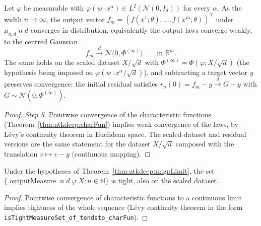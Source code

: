 \begin{theorem}\label{thm:ntkdeep:nngpLimit}
  \leanok
Let $\varphi$ be measurable with $\varphi(w\cdot x^\alpha)\in L^2(\mathcal N(0,I_d))$ for every $\alpha$. As the width $n\to\infty$, the output vector $f_m=(f(x^1;\theta),\dots,f(x^m;\theta))^\top$ under $\mu_{n,d}\;n\;d$ converges in distribution, equivalently the output laws converge weakly, to the centred Gaussian
\[
  f_m\xrightarrow{d}\mathcal N\bigl(0,\Phi^{(\infty)}\bigr)\qquad\text{in }\mathbb R^m .
\]
The same holds on the scaled dataset $X/\sqrt d$ with $\Phi^{(\infty)}=\Phi(\varphi;X/\sqrt d)$ (the hypothesis being imposed on $\varphi(w\cdot x^\alpha/\sqrt d)$), and subtracting a target vector $y$ preserves convergence: the initial residual satisfies $r_n(0)=f_m-y\xrightarrow{d}G-y$ with $G\sim\mathcal N(0,\Phi^{(\infty)})$.
\end{theorem}

\begin{proof}
  \leanok
\emph{Step 5.} Pointwise convergence of the characteristic functions (Theorem~\ref{thm:ntkdeep:charFun}) implies weak convergence of the laws, by L\'evy's continuity theorem in Euclidean space. The scaled-dataset and residual versions are the same statement for the dataset $X/\sqrt d$ composed with the translation $v\mapsto v-y$ (continuous mapping).
\end{proof}

\begin{theorem}\label{thm:ntkdeep:tightness}
  \leanok
Under the hypotheses of Theorem~\ref{thm:ntkdeep:nngpLimit}, the set $\{\operatorname{outputMeasure}\;n\;d\;\varphi\;X:n\in\mathbb N\}$ is tight, also on the scaled dataset.
\end{theorem}

\begin{proof}
  \leanok
Pointwise convergence of characteristic functions to a continuous limit implies tightness of the whole sequence (L\'evy continuity theorem in the form \texttt{isTightMeasureSet\_of\_tendsto\_charFun}).
\end{proof}

